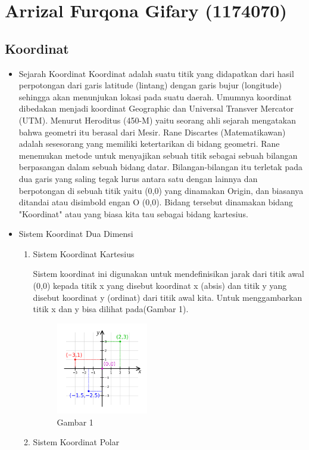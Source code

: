\section{Arrizal Furqona Gifary (1174070)}
\subsection{Koordinat}
\begin{itemize}
	\item Sejarah Koordinat
Koordinat adalah suatu titik yang didapatkan dari hasil perpotongan dari garis latitude (lintang) dengan garis bujur (longitude) sehingga akan menunjukan lokasi pada suatu daerah. Umumnya koordinat dibedakan menjadi koordinat Geographic dan Universal Transver Mercator (UTM). 	
Menurut Heroditus (450-M) yaitu seorang ahli sejarah mengatakan bahwa geometri itu berasal dari Mesir. Rane Discartes (Matematikawan) adalah sesesorang yang memiliki ketertarikan di bidang geometri. Rane menemukan metode untuk menyajikan sebuah titik sebagai sebuah bilangan berpasangan dalam sebuah bidang datar. Bilangan-bilangan itu terletak pada dua garis yang saling tegak lurus antara satu dengan lainnya dan berpotongan di sebuah titik yaitu (0,0) yang dinamakan Origin, dan biasanya ditandai atau disimbold engan O (0,0). Bidang tersebut dinamakan bidang "Koordinat" atau yang biasa kita tau sebagai bidang kartesius.
	\item Sistem Koordinat Dua Dimensi
	\begin{enumerate}
	\item Sistem Koordinat Kartesius
	
Sistem koordinat ini digunakan untuk mendefinisikan jarak dari titik awal (0,0) kepada titik x yang disebut koordinat x (absis) dan titik y yang disebut koordinat y (ordinat) dari titik awal kita.
Untuk menggambarkan titik x dan y bisa dilihat pada(Gambar 1).
	\begin{figure}[H]
	\includegraphics[width=4cm]{figures/Tugas1/1174070/kartesius.png}
	\centering
	\caption{Gambar 1}
\end{figure}
	
	\item Sistem Koordinat Polar


\end{enumerate}
\end{itemize}
